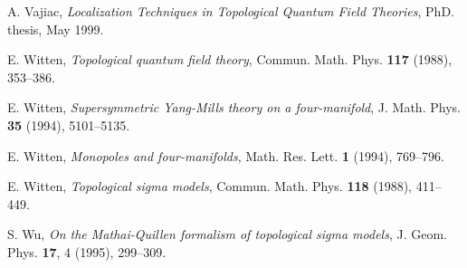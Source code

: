 \documentclass[a4paper,12pt,reqno,sumlimits]{amsart}
\theoremstyle{plain}
\theoremstyle{definition}
\newcommand{\1}{{\bf 1}}
\numberwithin{equation}{section}
\begin{document}
\begin{thebibliography}{999}
 A. Vajiac, {\em Localization Techniques in Topological
    Quantum Field Theories}, PhD. thesis, May 1999.

 E. Witten, {\em Topological quantum field theory},
  Commun. Math. Phys. {\bf 117} (1988), 353--386.
  
 E. Witten, {\em Supersymmetric Yang-Mills theory on a
    four-manifold}, J. Math. Phys. {\bf 35} (1994), 5101--5135.
  
 E. Witten, {\em Monopoles and four-manifolds}, Math. Res.
  Lett. {\bf 1} (1994), 769--796.
  
 E. Witten, {\em Topological sigma models}, Commun. Math.
  Phys. {\bf 118} (1988), 411--449.
  
 S. Wu, {\em On the Mathai-Quillen formalism of topological sigma
    models}, J. Geom. Phys. {\bf 17}, 4 (1995), 299--309.

\end{thebibliography}
  
\end{document}
